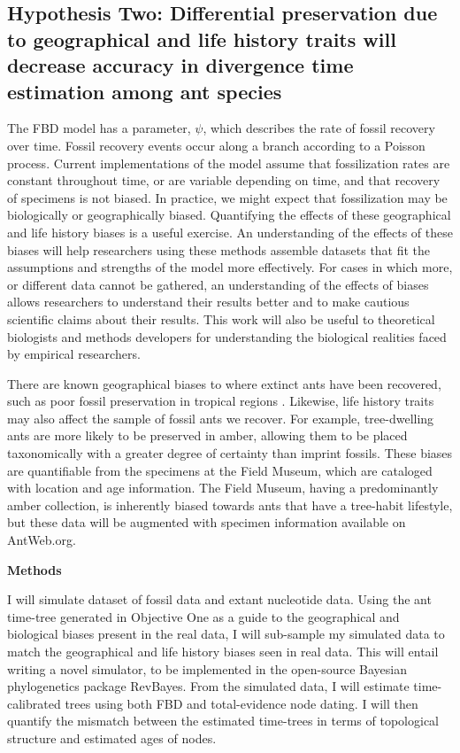 \documentclass[]{article}
\begin{document}
\subsection*{Hypothesis Two: Differential preservation due to geographical and life history traits will decrease accuracy in divergence time estimation among ant species}
The FBD model has a parameter, $\psi$, which describes the rate of fossil recovery over time. Fossil recovery events occur along a branch according to a Poisson process. Current implementations of the model assume that fossilization rates are constant throughout time, or are variable depending on time, and that recovery of specimens is not biased. In practice, we might expect that fossilization may be biologically or geographically biased. Quantifying the effects of these geographical and life history biases is a useful exercise. An understanding of the effects of these biases will help researchers using these methods assemble datasets that fit the assumptions and strengths of the model more effectively. For cases in which more, or different data cannot be gathered, an understanding of the effects of biases allows researchers to understand their results better and to make cautious scientific claims about their results. This work will also be useful to theoretical biologists and methods developers for understanding the biological realities faced by empirical researchers. \par

There are known geographical biases to where extinct ants have been recovered, such as poor fossil preservation in tropical regions \citep{ref76}. Likewise, life history traits may also affect the sample of fossil ants we recover. For example, tree-dwelling ants are more likely to be preserved in amber, allowing them to be placed taxonomically with a greater degree of certainty than imprint fossils. These biases are quantifiable from the specimens at the Field Museum, which are cataloged with location and age information. The Field Museum, having a predominantly amber collection, is inherently biased towards ants that have a tree-habit lifestyle, but these data will be augmented with specimen information available on AntWeb.org. \par
	
\textbf{Methods} \par
I will simulate  dataset of fossil data and extant nucleotide data. Using the ant time-tree generated in Objective One as a guide to the geographical and biological biases present in the real data, I will sub-sample my simulated data to match the geographical and life history biases seen in real data. This will entail writing a novel simulator, to be implemented in the open-source Bayesian phylogenetics package RevBayes. From the simulated data, I will estimate time-calibrated trees using both FBD and total-evidence node dating. I will then quantify the mismatch between the estimated time-trees in terms of topological structure and estimated ages of nodes. 
\end{document}
